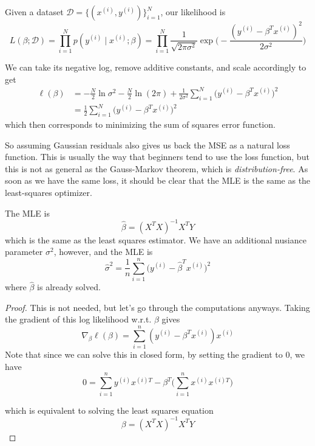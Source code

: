   \begin{lemma}[Likelihood]
    Given a dataset $\mathcal{D} = \{(x^{(i)}, y^{(i)})\}_{i=1}^N$, our likelihood is 
    \[L(\beta ; \mathcal{D}) = \prod_{i=1}^N p(y^{(i)} \mid x^{(i)}; \beta) = \prod_{i=1}^N \frac{1}{\sqrt{2 \pi \sigma^2}} \exp \bigg( -\frac{(y^{(i)} - \beta^T x^{(i)})^2}{2 \sigma^2} \bigg)\]
  \end{lemma} 

  \begin{theorem}
    We can take its negative log, remove additive constants, and scale accordingly to get 
    \begin{align}
      \ell (\beta) & = -\frac{N}{2} \ln{\sigma^2} - \frac{N}{2} \ln(2 \pi) + \frac{1}{2 \sigma^2} \sum_{i=1}^N \big(y^{(i)} - \beta^T x^{(i)} \big)^2 \\
      & =\frac{1}{2} \sum_{i=1}^N \big(y^{(i)} - \beta^T x^{(i)} \big)^2 
    \end{align}
    which then corresponds to minimizing the sum of squares error function. 
  \end{theorem}

  So assuming Gaussian residuals also gives us back the MSE as a natural loss function. This is usually the way that beginners tend to use the loss function, but this is not as general as the Gauss-Markov theorem, which is \textit{distribution-free}. As soon as we have the same loss, it should be clear that the MLE is the same as the least-squares optimizer. 

  \begin{corollary}
    The MLE is 
    \begin{equation}
      \hat{\beta} = (X^T X)^{-1} X^T Y
    \end{equation}
    which is the same as the least squares estimator. We have an additional nusiance parameter $\sigma^2$, however, and the MLE is 
    \begin{equation}
      \hat{\sigma}^2 = \frac{1}{n} \sum_{i=1}^n \big( y^{(i)} - \hat{\beta}^T x^{(i)} \big)^2
    \end{equation}
    where $\hat{\beta}$ is already solved. 
  \end{corollary}
  \begin{proof}
    This is not needed, but let's go through the computations anyways. Taking the gradient of this log likelihood w.r.t. $\beta$ gives 
    \begin{equation}
      \nabla_\beta \ell (\beta) = \sum_{i=1}^n ( y^{(i)} - \beta^T x^{(i)}) x^{(i)}
    \end{equation}
    Note that since we can solve this in closed form, by setting the gradient to $0$, we have 
    \begin{equation}
      0 = \sum_{i=1}^n y^{(i)} x^{(i) T} - \beta^T \bigg( \sum_{i=1}^n x^{(i)} x^{(i) T} \bigg)
    \end{equation}

    which is equivalent to solving the least squares equation 
    \begin{equation}
      \beta = ( X^T X)^{-1} X^T Y
    \end{equation}
  \end{proof}

